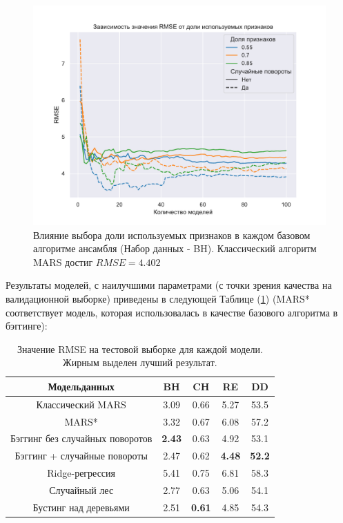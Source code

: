 \documentclass{article}
\begin{document}
\begin{figure}[H] %
\begin{center}
    \includegraphics[scale=0.55]{figures/be_subsample.pdf}
    \caption{Влияние выбора доли используемых признаков в каждом базовом алгоритме ансамбля (Набор данных - BH). Классический алгоритм MARS достиг $RMSE = 4.402$}\label{fig::2}
\end{center}
\end{figure}

Результаты моделей, с наилучшими параметрами (с точки зрения качества на валидационной выборке) приведены в следующей Таблице (\ref{tab:1})
(MARS* соответствует модель, которая использовалась в качестве базового алгоритма в бэггинге):

\begin{table}[H]
\begin{center}
\begin{tabular}{|c|c|c|c|c|}
\hline
Модель данных & BH & CH & RE & DD\\
    \hline
    Классический MARS  & 3.09 &  0.66 &  5.27 &  53.5\\
    \hline
    MARS* & 3.32 &  0.67 &  6.08 &  57.2\\
    \hline
    Бэггинг без случайных поворотов  & \textbf{2.43} & 0.63 &  4.92 &  53.1\\
    \hline
    Бэггинг + 
    случайные повороты & 2.47 & 0.62 &  \textbf{4.48} &  \textbf{52.2}\\
    \hline
    Ridge-регрессия  & 5.41 &  0.75 &  6.81 &  58.3\\
    \hline
    Случайный лес  & 2.77 & 0.63 & 5.06 &  54.1\\
    \hline
    Бустинг над 
    деревьями & 2.51 &  \textbf{0.61} &  4.85 &  54.3\\
    \hline
\end{tabular}
\caption{\label{tab:1} Значение RMSE на тестовой выборке для каждой модели. Жирным выделен лучший результат.}
\end{center}
\end{table}
\end{document}

